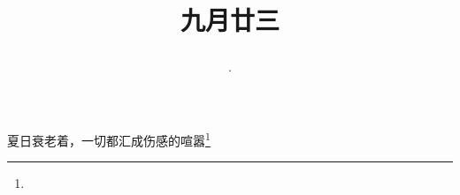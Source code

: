 \title{\date[d=25,m=10,y=2024][year:cn-y,年,month:cn,day:cn,日,·,weekday]·九月廿三 }
夏日衰老着，一切都汇成伤感的喧嚣\footnote{ }

